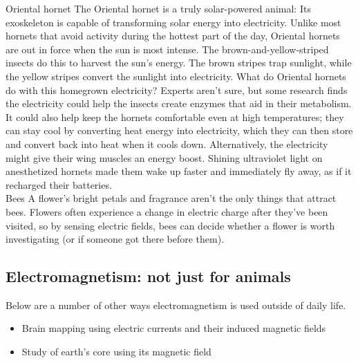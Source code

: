 Oriental hornet
The Oriental hornet is a truly solar-powered animal: Its exoskeleton is capable of transforming solar energy into electricity.
Unlike most hornets that avoid activity during the hottest part of the day, Oriental hornets are out in force when the sun is most intense. The brown-and-yellow-striped insects do this to harvest the sun’s energy.
The brown stripes trap sunlight, while the yellow stripes convert the sunlight into electricity.
What do Oriental hornets do with this homegrown electricity? Experts aren’t sure, but some research finds the electricity could help the insects create enzymes that aid in their metabolism. It could also help keep the hornets comfortable even at high temperatures; they can stay cool by converting heat energy into electricity, which they can then store and convert back into heat when it cools down.
Alternatively, the electricity might give their wing muscles an energy boost. Shining ultraviolet light on anesthetized hornets made them wake up faster and immediately fly away, as if it recharged their batteries.\\

Bees
A flower's bright petals and fragrance aren't the only things that attract bees. Flowers often experience a change in electric charge after they've been visited, so by sensing electric fields, bees can decide whether a flower is worth investigating (or if someone got there before them).

\subsection{Electromagnetism: not just for animals}

\noindent Below are a number of other ways electromagnetism is used outside of daily life.
\begin{itemize}
\item Brain mapping using electric currents and their induced magnetic fields
\item Study of earth's core using its magnetic field
\end{itemize}

